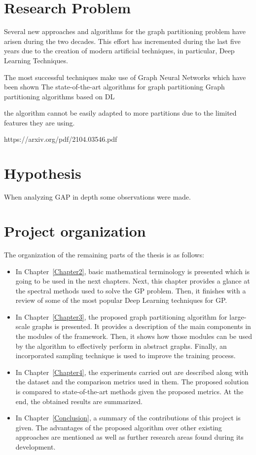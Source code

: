 \section{Research Problem}
Several new approaches and algorithms for the graph partitioning problem have arisen during the two decades. This effort has incremented during the last five years due to the creation of modern artificial techniques, in particular, Deep Learning Techniques.

The most successful techniques make use of Graph Neural Networks which have been shown 
The state-of-the-art algorithms for graph partitioning 
Graph partitioning algorithms based on DL

the algorithm cannot be easily adapted to more partitions due to the limited features they are using.

https://arxiv.org/pdf/2104.03546.pdf
\section{Hypothesis}
When analyzing GAP in depth some observations were made.

\section{Project organization}

The organization of the remaining parts of the thesis is as follows:
\begin{itemize}
    \item In Chapter~\ref{Chapter2}, basic mathematical terminology is presented which is going to be used in the next chapters. Next, this chapter provides a glance at the spectral methods used to solve the GP problem. Then, it finishes with a review of some of the most popular Deep Learning techniques for GP.
    
    \item In Chapter~\ref{Chapter3}, the proposed graph partitioning algorithm for large-scale graphs is presented. It provides a description of the main components in the modules of the framework. Then, it shows how those modules can be used by the algorithm to effectively perform in abstract graphs. Finally, an incorporated sampling technique is used to improve the training process.
    
    \item In Chapter~\ref{Chapter4}, the experiments carried out are described along with the dataset and the comparison metrics used in them. The proposed solution is compared to state-of-the-art methods given the proposed metrics. At the end, the obtained results are summarized.
    
    \item In Chapter~\ref{Conclusion}, a summary of the contributions of this project is given. The advantages of the proposed algorithm over other existing approaches are mentioned as well as further research areas found during its development.
\end{itemize}

